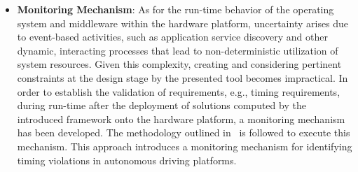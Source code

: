 \begin{itemize}
    
    \item \textbf{Monitoring Mechanism}: 
    As for the run-time behavior of the operating system and middleware within the hardware platform, uncertainty arises due to event-based activities, such as application service discovery and other dynamic, interacting processes that lead to non-deterministic utilization of system resources. Given this complexity, creating and considering pertinent constraints at the design stage by the presented tool becomes impractical.
    In order to establish the validation of requirements, e.g., timing requirements, during run-time after the deployment of solutions computed by the introduced framework onto the hardware platform, a monitoring mechanism has been developed.
    The methodology outlined in~\cite{askaripoor2021flexible} is followed to execute this mechanism. This approach introduces a monitoring mechanism for identifying timing violations in autonomous driving platforms. 
          

\end{itemize}
